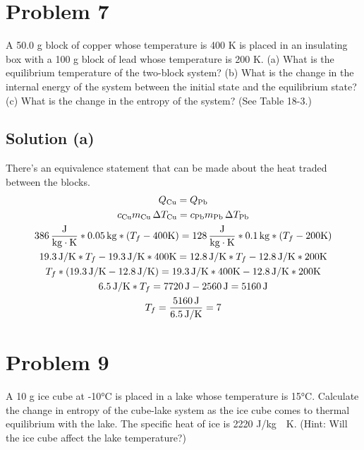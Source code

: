 \documentclass[12pt]{article}
\begin{document}
    \pagebreak
    \section{Problem 7}
        A 50.0 g block of copper whose temperature is 400 K is placed in an insulating box with a 100 g block of lead whose temperature is 200 K. 
        (a) What is the equilibrium temperature of the two-block system? 
        (b) What is the change in the internal energy of the system between the initial state and the equilibrium state? 
        (c) What is the change in the entropy of the system? (See Table 18-3.)

        \subsection{Solution (a)}
            There's an equivalence statement that can be made about the heat traded between the blocks.
            \begin{gather}
                Q_{\rm Cu}  =   Q_{\rm Pb}\\
                c_{\rm Cu} m_{\rm Cu}\,\Delta T_{\rm Cu} = c_{\rm Pb} m_{\rm Pb}\,\Delta T_{\rm Pb}\\
                386\,\unit{\frac{J}{\kilo\gram\cdot\kelvin}} * 0.05\,\unit{\kilo\gram} * \left( T_f - 400\unit{\kelvin} \right) = 128\,\unit{\frac{J}{\kilo\gram\cdot\kelvin}} * 0.1\,\unit{\kilo\gram} * \left( T_f - 200\unit{\kelvin} \right)\\
                19.3\,\unit{\joule/\kelvin} * T_f - 19.3\,\unit{\joule/\kelvin} * 400\unit{\kelvin} = 12.8\,\unit{\joule/\kelvin} * T_f - 12.8\,\unit{\joule/\kelvin} * 200\unit{\kelvin}\\
                T_f * (19.3\,\unit{\joule/\kelvin} - 12.8\,\unit{\joule/\kelvin}) = 19.3\,\unit{\joule/\kelvin} * 400\unit{\kelvin} - 12.8\,\unit{\joule/\kelvin} * 200\unit{\kelvin}\\
                6.5\,\unit{\joule/\kelvin} * T_f = 7720\,\unit{\joule} - 2560\,\unit{\joule}
                    =   5160\,\unit{\joule}\\
                T_f =   \frac{5160\,\unit{\joule}}{6.5\,\unit{\joule/\kelvin}}
                    =   7
            \end{gather}

    \pagebreak
    \section{Problem 9}
        A 10 g ice cube at -10\unit{\celsius} is placed in a lake whose temperature is 15°C. 
        Calculate the change in entropy of the cube-lake system as the ice cube comes to thermal equilibrium with the lake. 
        The specific heat of ice is 2220 \unit{\joule/\kilo\gram\cdot\kelvin}. 
        (Hint: Will the ice cube affect the lake temperature?)
\end{document}
